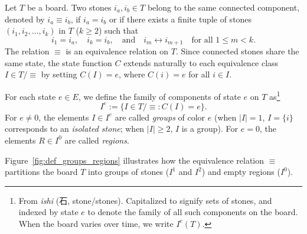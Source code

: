 \begin{definition}
	Let $T$ be a board. Two stones $i_a, i_b \in T$ belong to the same connected component, denoted by $i_a \equiv i_b$, if $i_a = i_b$ or if there exists a finite tuple of stones $(i_1, i_2, \dots, i_k)$ in $T$ ($k \ge 2$) such that
	\[
	i_1 = i_a, \quad i_k = i_b, \quad \text{and} \quad i_m \leftrightarrow i_{m+1} \quad \text{for all } 1 \le m < k.
	\]
	The relation $\equiv$ is an equivalence relation on $T$. Since connected stones share the same state, the state function $C$ extends naturally to each equivalence class $I \in T / {\equiv}$ by setting $C(I) = e$, where $C(i) = e$ for all $i \in I$.
	
	For each state $e \in E$, we define the family of components of state $e$ on $T$ as\footnote{From \emph{ishi} (石, stone/stones). Capitalized to signify sets of stones, and indexed by state $e$ to denote the family of all such components on the board. When the board varies over time, we write $I^e(T)$.}
	\[
	I^e := \{ I \in T / {\equiv} : C(I) = e \}.
	\]
	For $e \neq 0$, the elements $I \in I^e$ are called \emph{groups} of color $e$ (when $|I| = 1$, $I = \{i\}$ corresponds to an \emph{isolated stone}; when $|I| \ge 2$, $I$ is a group). For $e = 0$, the elements $R \in I^0$ are called \emph{regions}.
\end{definition}

Figure~\ref{fig:def_groups_regions} illustrates how the equivalence relation $\equiv$ partitions the board $T$ into groups of stones ($I^1$ and $I^2$) and empty regions ($I^0$).

